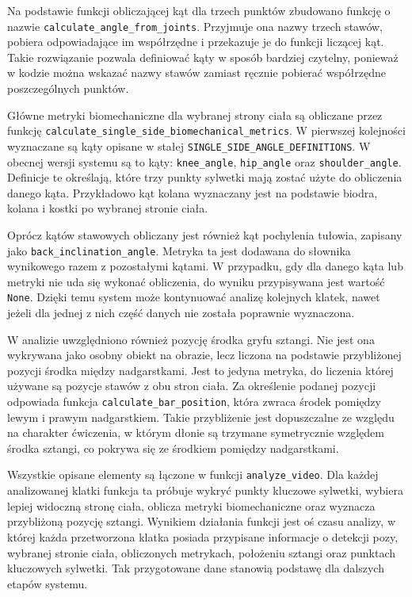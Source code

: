 Na podstawie funkcji obliczającej kąt dla trzech punktów zbudowano funkcję o nazwie \texttt{calculate\_angle\_from\_joints}. Przyjmuje ona nazwy trzech stawów, pobiera odpowiadające im współrzędne i przekazuje je do funkcji liczącej kąt. Takie rozwiązanie pozwala definiować kąty w sposób bardziej czytelny, ponieważ w kodzie można wskazać nazwy stawów zamiast ręcznie pobierać współrzędne poszczególnych punktów.

Główne metryki biomechaniczne dla wybranej strony ciała są obliczane przez funkcję \texttt{calculate\_single\_side\_biomechanical\_metrics}. W pierwszej kolejności wyznaczane są kąty opisane w stałej \texttt{SINGLE\_SIDE\_ANGLE\_DEFINITIONS}. W obecnej wersji systemu są to kąty: \texttt{knee\_angle}, \texttt{hip\_angle} oraz \texttt{shoulder\_angle}. Definicje te określają, które trzy punkty sylwetki mają zostać użyte do obliczenia danego kąta. Przykładowo kąt kolana wyznaczany jest na podstawie biodra, kolana i kostki po wybranej stronie ciała.

Oprócz kątów stawowych obliczany jest również kąt pochylenia tułowia, zapisany jako \texttt{back\_inclination\_angle}. Metryka ta jest dodawana do słownika wynikowego razem z pozostałymi kątami. W przypadku, gdy dla danego kąta lub metryki nie uda się wykonać obliczenia, do wyniku przypisywana jest wartość \texttt{None}. Dzięki temu system może kontynuować analizę kolejnych klatek, nawet jeżeli dla jednej z nich część danych nie została poprawnie wyznaczona.

W analizie uwzględniono również pozycję środka gryfu sztangi. Nie jest ona wykrywana jako osobny obiekt na obrazie, lecz liczona na podstawie przybliżonej pozycji środka między nadgarstkami. Jest to jedyna metryka, do liczenia której używane są pozycje stawów z obu stron ciała. Za określenie podanej pozycji odpowiada funkcja \texttt{calculate\_bar\_position}, która zwraca środek pomiędzy lewym i prawym nadgarstkiem. Takie przybliżenie jest dopuszczalne ze względu na charakter ćwiczenia, w którym dłonie są trzymane symetrycznie względem środka sztangi, co pokrywa się ze środkiem pomiędzy nadgarstkami.

Wszystkie opisane elementy są łączone w funkcji \texttt{analyze\_video}. Dla każdej analizowanej klatki funkcja ta próbuje wykryć punkty kluczowe sylwetki, wybiera lepiej widoczną stronę ciała, oblicza metryki biomechaniczne oraz wyznacza przybliżoną pozycję sztangi. Wynikiem działania funkcji jest oś czasu analizy, w której każda przetworzona klatka posiada przypisane informacje o detekcji pozy, wybranej stronie ciała, obliczonych metrykach, położeniu sztangi oraz punktach kluczowych sylwetki. Tak przygotowane dane stanowią podstawę dla dalszych etapów systemu.

